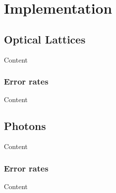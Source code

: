
\chapter{Implementation} %

\label{ch:implement} %


\section{Optical Lattices}

Content


\subsection{Error rates}

Content


\section{Photons}

Content


\subsection{Error rates}

Content